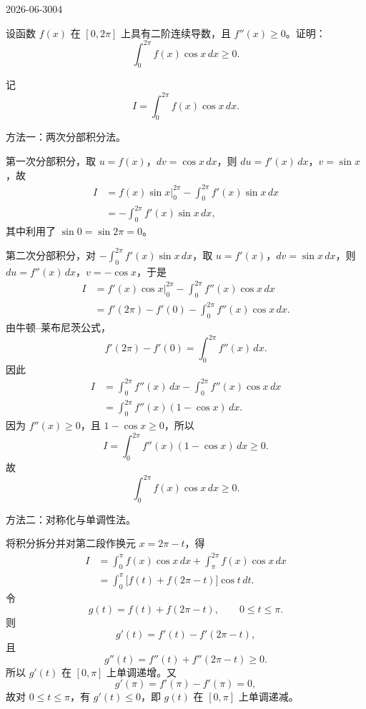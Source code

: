 \begin{mistake}{2026-06-30}{04}
\begin{problemcontent}
设函数 \(f(x)\) 在 \([0,2\pi]\) 上具有二阶连续导数，且 \(f''(x)\ge 0\)。证明：
\[
\int_0^{2\pi} f(x)\cos x\,dx\ge 0.
\]
\end{problemcontent}
\begin{solutioncontent}
记
\[
I=\int_0^{2\pi} f(x)\cos x\,dx.
\]

方法一：两次分部积分法。

第一次分部积分，取 \(u=f(x)\)，\(dv=\cos x\,dx\)，则 \(du=f'(x)\,dx\)，\(v=\sin x\)，故
\[
\begin{aligned}
I
&=f(x)\sin x\big|_0^{2\pi}-\int_0^{2\pi}f'(x)\sin x\,dx \\
&=-\int_0^{2\pi}f'(x)\sin x\,dx,
\end{aligned}
\]
其中利用了 \(\sin0=\sin2\pi=0\)。

第二次分部积分，对 \(-\int_0^{2\pi}f'(x)\sin x\,dx\)，取 \(u=f'(x)\)，\(dv=\sin x\,dx\)，则 \(du=f''(x)\,dx\)，\(v=-\cos x\)，于是
\[
\begin{aligned}
I
&=f'(x)\cos x\big|_0^{2\pi}-\int_0^{2\pi}f''(x)\cos x\,dx \\
&=f'(2\pi)-f'(0)-\int_0^{2\pi}f''(x)\cos x\,dx.
\end{aligned}
\]
由牛顿--莱布尼茨公式，
\[
 f'(2\pi)-f'(0)=\int_0^{2\pi}f''(x)\,dx.
\]
因此
\[
\begin{aligned}
I
&=\int_0^{2\pi}f''(x)\,dx-\int_0^{2\pi}f''(x)\cos x\,dx \\
&=\int_0^{2\pi}f''(x)(1-\cos x)\,dx.
\end{aligned}
\]
因为 \(f''(x)\ge 0\)，且 \(1-\cos x\ge 0\)，所以
\[
I=\int_0^{2\pi}f''(x)(1-\cos x)\,dx\ge 0.
\]
故
\[
\int_0^{2\pi} f(x)\cos x\,dx\ge 0.
\]

方法二：对称化与单调性法。

将积分拆分并对第二段作换元 \(x=2\pi-t\)，得
\[
\begin{aligned}
I
&=\int_0^\pi f(x)\cos x\,dx+\int_\pi^{2\pi}f(x)\cos x\,dx \\
&=\int_0^\pi \bigl[f(t)+f(2\pi-t)\bigr]\cos t\,dt.
\end{aligned}
\]
令
\[
 g(t)=f(t)+f(2\pi-t),\qquad 0\le t\le \pi.
\]
则
\[
 g'(t)=f'(t)-f'(2\pi-t),
\]
且
\[
 g''(t)=f''(t)+f''(2\pi-t)\ge 0.
\]
所以 \(g'(t)\) 在 \([0,\pi]\) 上单调递增。又
\[
 g'(\pi)=f'(\pi)-f'(\pi)=0,
\]
故对 \(0\le t\le\pi\)，有 \(g'(t)\le 0\)，即 \(g(t)\) 在 \([0,\pi]\) 上单调递减。


\end{solutioncontent}
\end{mistake}
